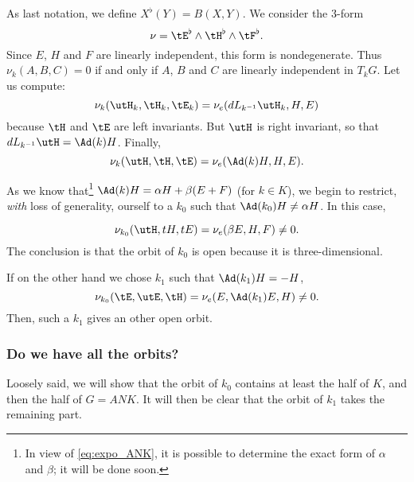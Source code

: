 As last notation, we define $X^{\flat}(Y)=B(X,Y)$. We consider the $3$-form
\[
   \nu=\tE^{\flat}\wedge\tH^{\flat}\wedge\tF^{\flat}.
\]
Since $E$, $H$ and $F$ are linearly independent, this form is nondegenerate. Thus $\nu_k(A,B,C)=0$ if and only if $A$, $B$ and $C$ are linearly independent in $T_kG$. Let us compute:
\[
\nu_k(\utH_k,\tH_k,\tE_k)=\nu_e(dL_{k^{-1}}\utH_k,H,E)
\]
because $\tH$ and $\tE$ are left invariants. But $\utH$ is right invariant, so that $dL_{k^{-1}}\utH=\Ad(k)H$. Finally,
\begin{equation}
\nu_k(\utH,\tH,\tE)=\nu_e(\Ad(k)H,H,E).
\end{equation}


As we know that\footnote{In view of \eqref{eq:expo_ANK}, it is possible to determine the exact form of $\alpha$ and $\beta$; it will be done soon.} $\Ad(k)H=\alpha H+\beta(E+F)$ (for $k\in K$), we begin to restrict, \emph{with} loss of generality,  ourself to a $k_0$ such that $\Ad(k_0)H\neq\alpha H$. In this case,

\begin{equation}
   \nu_{k_0}(\utH,tH,tE)=\nu_e(\beta E,H,F)\neq 0.
\end{equation}
The conclusion is that the orbit of $k_0$ is open because it is three-dimensional.

If on the other hand we chose $k_1$ such that $\Ad(k_1)H=-H$,
\[
   \nu_{k_0}(\tE,\utE,\tH)=\nu_e(E,\Ad(k_1)E,H)\neq 0.
\]
Then, such a $k_1$ gives an other open orbit.

\subsubsection{Do we have all the orbits?}

Loosely said, we will show that the orbit of $k_0$ contains at least the half of $K$, and then the half of $G=ANK$. It will then be clear that the orbit of $k_1$ takes the remaining part.

